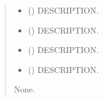 \documentclass[letterpaper,10pt,english]{sphinxmanual}
\begin{document}
\begin{fulllineitems}
\label{\detokenize{MUFBVAR:MUFBVAR.mfbvar_funcs.calc_yyact}}
\pysigstartsignatures
{}
\pysigstopsignatures\begin{quote}\begin{description}
\begin{itemize}
\item {} 
\sphinxAtStartPar
{} () \textendash{} DESCRIPTION.

\item {} 
\sphinxAtStartPar
{} () \textendash{} DESCRIPTION.

\item {} 
\sphinxAtStartPar
{} () \textendash{} DESCRIPTION.

\item {} 
\sphinxAtStartPar
{} () \textendash{} DESCRIPTION.

\end{itemize}

\sphinxAtStartPar
None.

\end{description}\end{quote}

\end{fulllineitems}

\end{document}

